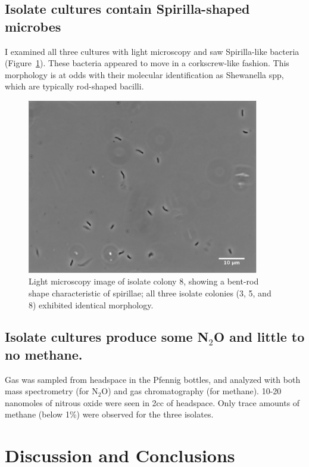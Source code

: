 \documentclass{article}
\begin{document}
\subsection*{Isolate cultures contain Spirilla-shaped microbes}

I examined all three cultures with light microscopy and saw
Spirilla-like bacteria (Figure~\ref{fig:spirilla}).  These bacteria
appeared to move in a corkscrew-like fashion.  This morphology is at
odds with their molecular identification as Shewanella spp, which are
typically rod-shaped bacilli.

\begin{figure}[!ht]
  \centerline{\includegraphics[width=4in]{spirilla.png}}
  \caption{Light microscopy image of isolate colony 8, showing a
    bent-rod shape characteristic of spirillae; all three isolate
    colonies (3, 5, and 8) exhibited identical morphology.}
  \label{fig:spirilla}
\end{figure}

\subsection*{Isolate cultures produce some N$_2$O and little to no methane.}

Gas was sampled from headspace in the Pfennig bottles, and analyzed
with both mass spectrometry (for N$_2$O) and gas chromatography (for
methane).  10-20 nanomoles of nitrous oxide were seen in 2cc of
headspace.  Only trace amounts of methane (below 1\%) were observed
for the three isolates.

\section*{Discussion and Conclusions}
\end{document}
